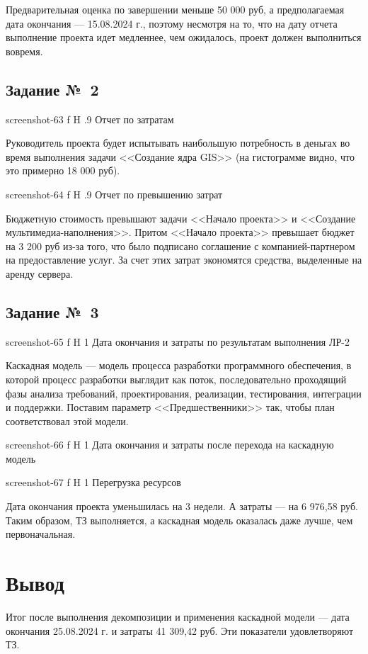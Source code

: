 \documentclass{bmstu}
\begin{document}
Предварительная оценка по завершении меньше 50 000 руб, а предполагаемая дата окончания --- 15.08.2024 г., поэтому несмотря на то, что на дату отчета выполнение проекта идет медленнее, чем ожидалось, проект должен выполниться вовремя.
    
\subsection{Задание №~2}
    
    {screenshot-63}
    {f}
    {H}
    {.9\textwidth}
    {Отчет по затратам}
    
Руководитель проекта будет испытывать наибольшую потребность в деньгах во время выполнения задачи <<Создание ядра GIS>> (на гистограмме видно, что это примерно 18 000 руб).

    {screenshot-64}
    {f}
    {H}
    {.9\textwidth}
    {Отчет по превышению затрат}
    
Бюджетную стоимость превышают задачи <<Начало проекта>> и <<Создание мультимедиа-наполнения>>. 
Притом <<Начало проекта>> превышает бюджет на 3 200 руб из-за того, что было подписано соглашение с компанией-партнером на предоставление услуг. 
За счет этих затрат экономятся средства, выделенные на аренду сервера.

\subsection{Задание №~3}

    {screenshot-65}
    {f}
    {H}
    {1\textwidth}
    {Дата окончания и затраты по результатам выполнения ЛР-2}
    
Каскадная модель --- модель процесса разработки программного обеспечения, в которой процесс разработки выглядит как поток, последовательно проходящий фазы анализа требований, проектирования, реализации, тестирования, интеграции и поддержки. 
Поставим параметр <<Предшественники>> так, чтобы план соответствовал этой модели.
    
    {screenshot-66}
    {f}
    {H}
    {1\textwidth}
    {Дата окончания и затраты после перехода на каскадную модель}
    
    {screenshot-67}
    {f}
    {H}
    {1\textwidth}
    {Перегрузка ресурсов}    

Дата окончания проекта уменьшилась на 3 недели. 
А затраты --- на 6 976,58 руб. 
Таким образом, ТЗ выполняется, а каскадная модель оказалась даже лучше, чем первоначальная.
    
\section{Вывод}

Итог после выполнения декомпозиции и применения каскадной модели --- дата окончания 25.08.2024 г. и затраты 41 309,42 руб. 
Эти показатели удовлетворяют ТЗ.
\end{document}

